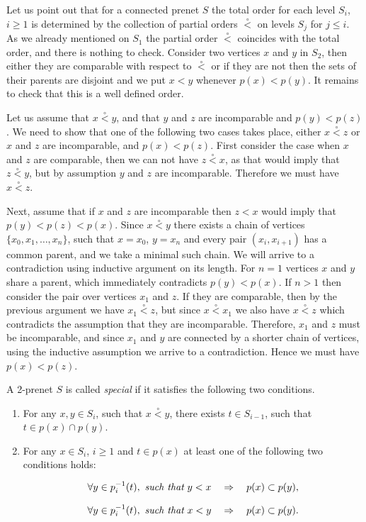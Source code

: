 \documentclass[letterpaper,12pt,leqno]{article}
\numberwithin{equation}{theorem}
\def\lesub{\mathop{<}\limits}
\def\pless{\lesub^\circ}
\begin{document}
\begin{remark}
\label{rem_total_order}
Let us point out that for a connected prenet $S$ the total order for each level $S_i$, $i \ge 1$ is determined by the collection of partial orders $\pless$ on levels $S_j$ for $j \le i$.
As we already mentioned on $S_1$ the partial order $\pless$ coincides with the total order, and there is nothing to check. Consider two vertices $x$ and $y$ in $S_2$, then either they
are comparable with respect to $\pless$ or if they are not then the sets of their parents are disjoint and we put $x < y$ whenever $p(x) < p(y)$. It remains to check that this is a
well defined order.

Let us assume that $x \pless y$, and that $y$ and $z$ are incomparable and $p(y) < p(z)$. We need to show that one of the following two cases takes place, either $x \pless z$ or $x$ and $z$ are
incomparable, and $p(x) < p(z)$. First consider the case when $x$ and $z$ are comparable, then we can not have $z \pless x$, as that would imply that $z \pless y$, but by assumption
$y$ and $z$ are incomparable. Therefore we must have $x \pless z$.

Next, assume that if $x$ and $z$ are incomparable then $z < x$ would imply that $p(y) < p(z) < p(x)$. Since $x \pless y$ there exists a chain of vertices $\{x_0, x_1, \ldots, x_n\}$, such that
$x = x_0$, $y = x_n$ and every pair $(x_i, x_{i+1})$ has a common parent, and we take a minimal such chain. We will arrive to a contradiction using inductive argument on its length. For $n = 1$ vertices $x$ and $y$
share a parent, which immediately contradicts $p(y) < p(x)$. If $n > 1$ then consider the pair over vertices $x_1$ and $z$. If they are comparable, then by the previous argument we have $x_1 \pless z$,
but since $x \pless x_1$ we also have $x \pless z$ which contradicts the assumption that they are incomparable. Therefore, $x_1$ and $z$ must be incomparable, and since $x_1$ and $y$ are connected by a shorter
chain of vertices, using the inductive assumption we arrive to a contradiction. Hence we must have $p(x) < p(z)$.
\end{remark}

\begin{definition}
\label{def_sp_prenet}
A 2-prenet $S$ is called {\em special} if it satisfies the following two conditions.
\begin{enumerate}[label=\alph*)]
\item For any $x, y \in S_i$, such that $x \pless y$, there exists $t \in S_{i-1}$, such that $t \in p(x) \cap p(y)$.

\item For any $x \in S_i$, $i \ge 1$ and $t \in p(x)$ at least one of the following two conditions holds:
$$
\begin{tikzcd}[row sep=tiny]
\forall y \in p_i^{-1}(t), \ \text{\em such that}\  y < x \quad\Rightarrow\quad p(x) \subset p(y),\\
\forall y \in p_i^{-1}(t), \ \text{\em such that}\  x < y \quad\Rightarrow\quad p(x) \subset p(y).\\
\end{tikzcd}
$$
\end{enumerate}
\end{definition}
\end{document}
